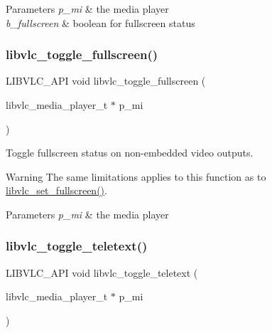 \begin{DoxyParams}{Parameters}
{\em p\+\_\+mi} & the media player \\
\hline
{\em b\+\_\+fullscreen} & boolean for fullscreen status \\
\hline
\end{DoxyParams}
\mbox{\label{group__libvlc__video_ga5e832c8ecc0de57b13a498db03ed8526}} 
\subsubsection{\texorpdfstring{libvlc\+\_\+toggle\+\_\+fullscreen()}{libvlc\_toggle\_fullscreen()}}
{\footnotesize\ttfamily L\+I\+B\+V\+L\+C\+\_\+\+A\+PI void libvlc\+\_\+toggle\+\_\+fullscreen (\begin{DoxyParamCaption}\item[{libvlc\+\_\+media\+\_\+player\+\_\+t $\ast$}]{p\+\_\+mi }\end{DoxyParamCaption})}

Toggle fullscreen status on non-\/embedded video outputs.

\begin{DoxyWarning}{Warning}
The same limitations applies to this function as to \hyperlink{group__libvlc__video_ga26892692dcb079743c9c7e0df3308ea4}{libvlc\+\_\+set\+\_\+fullscreen()}.
\end{DoxyWarning}

\begin{DoxyParams}{Parameters}
{\em p\+\_\+mi} & the media player \\
\hline
\end{DoxyParams}
\mbox{\label{group__libvlc__video_ga3ae3e07b4b1c9238e5526f3a3e453543}} 
\subsubsection{\texorpdfstring{libvlc\+\_\+toggle\+\_\+teletext()}{libvlc\_toggle\_teletext()}}
{\footnotesize\ttfamily L\+I\+B\+V\+L\+C\+\_\+\+A\+PI void libvlc\+\_\+toggle\+\_\+teletext (\begin{DoxyParamCaption}\item[{libvlc\+\_\+media\+\_\+player\+\_\+t $\ast$}]{p\+\_\+mi }\end{DoxyParamCaption})}

